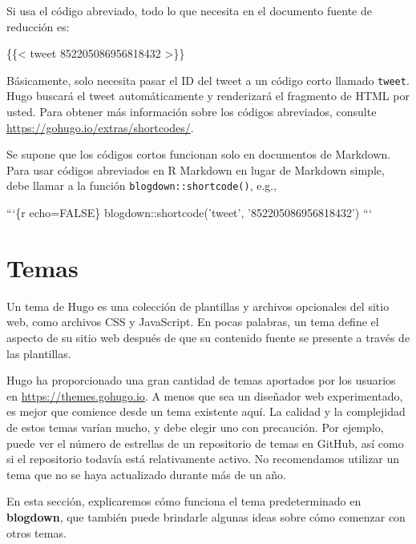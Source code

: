 \documentclass[12pt,]{krantz}
\makeatletter
\newenvironment{Shaded}{\begin{snugshade}}{\end{snugshade}}
\newcommand{\DecValTok}[1]{\textcolor[rgb]{0.00,0.00,0.81}{#1}}
\newcommand{\NormalTok}[1]{#1}
\newenvironment{kframe}{%
\medskip{}
\setlength{\fboxsep}{.8em}
 \def\at@end@of@kframe{}%
 \ifinner\ifhmode%
  \def\at@end@of@kframe{\end{minipage}}%
  \begin{minipage}{\columnwidth}%
 \fi\fi%
 \def\FrameCommand##1{\hskip\@totalleftmargin \hskip-\fboxsep
 \colorbox{shadecolor}{##1}\hskip-\fboxsep
     \hskip-\linewidth \hskip-\@totalleftmargin \hskip\columnwidth}%
 \MakeFramed {\advance\hsize-\width
   \@totalleftmargin\z@ \linewidth\hsize
   \@setminipage}}%
 {\par\unskip\endMakeFramed%
 \at@end@of@kframe}
\renewenvironment{Shaded}{\begin{kframe}}{\end{kframe}}
\theoremstyle{definition}
\theoremstyle{definition}
\theoremstyle{definition}
\theoremstyle{remark}
\makeatother
\begin{document}
Si usa el código abreviado, todo lo que necesita en el documento fuente
de reducción es:

\begin{Shaded}
\begin{Highlighting}[]
\NormalTok{\{\{< tweet }\DecValTok{852205086956818432}\NormalTok{ >\}\}}
\end{Highlighting}
\end{Shaded}

Básicamente, solo necesita pasar el ID del tweet a un código corto
llamado \texttt{tweet}. Hugo buscará el tweet automáticamente y
renderizará el fragmento de HTML por usted. Para obtener más información
sobre los códigos abreviados, consulte
\url{https://gohugo.io/extras/shortcodes/}.

Se supone que los códigos cortos funcionan solo en documentos de
Markdown. Para usar códigos abreviados en R Markdown en lugar de
Markdown simple, debe llamar a la función
\texttt{blogdown::shortcode()}, e.g.,

\begin{Shaded}
\begin{Highlighting}[]
\NormalTok{```\{r echo=FALSE\}}
\NormalTok{blogdown::shortcode('tweet', '852205086956818432')}
\NormalTok{```}
\end{Highlighting}
\end{Shaded}

\hypertarget{temas}{%
\section{Temas}\label{temas}}

Un tema de Hugo es una colección de plantillas y archivos
opcionales del sitio web, como archivos CSS y JavaScript. En pocas
palabras, un tema define el aspecto de su sitio web después de que su
contenido fuente se presente a través de las plantillas.

Hugo ha proporcionado una gran cantidad de temas aportados por los
usuarios en \url{https://themes.gohugo.io}. A menos que sea un diseñador
web experimentado, es mejor que comience desde un tema existente aquí.
La calidad y la complejidad de estos temas varían mucho, y debe elegir
uno con precaución. Por ejemplo, puede ver el número de estrellas de un
repositorio de temas en GitHub, así como si el repositorio todavía está
relativamente activo. No recomendamos utilizar un tema que no se haya
actualizado durante más de un año.

En esta sección, explicaremos cómo funciona el tema predeterminado en
\textbf{blogdown}, que también puede brindarle algunas ideas sobre cómo
comenzar con otros temas.
\end{document}
